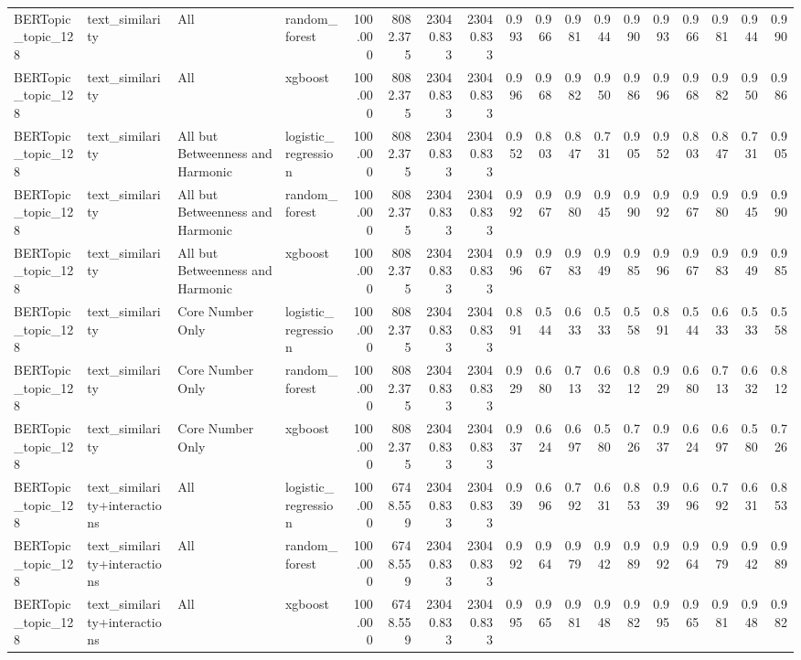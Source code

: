 \begin{tabular}{llllrrrrrrrrrrrrrr}
BERTopic_topic_128 & text_similarity & All & random_forest & 100.000 & 8082.375 & 23040.833 & 23040.833 & 0.993 & 0.966 & 0.981 & 0.944 & 0.990 & 0.993 & 0.966 & 0.981 & 0.944 & 0.990 \\
BERTopic_topic_128 & text_similarity & All & xgboost & 100.000 & 8082.375 & 23040.833 & 23040.833 & 0.996 & 0.968 & 0.982 & 0.950 & 0.986 & 0.996 & 0.968 & 0.982 & 0.950 & 0.986 \\
BERTopic_topic_128 & text_similarity & All but Betweenness and Harmonic & logistic_regression & 100.000 & 8082.375 & 23040.833 & 23040.833 & 0.952 & 0.803 & 0.847 & 0.731 & 0.905 & 0.952 & 0.803 & 0.847 & 0.731 & 0.905 \\
BERTopic_topic_128 & text_similarity & All but Betweenness and Harmonic & random_forest & 100.000 & 8082.375 & 23040.833 & 23040.833 & 0.992 & 0.967 & 0.980 & 0.945 & 0.990 & 0.992 & 0.967 & 0.980 & 0.945 & 0.990 \\
BERTopic_topic_128 & text_similarity & All but Betweenness and Harmonic & xgboost & 100.000 & 8082.375 & 23040.833 & 23040.833 & 0.996 & 0.967 & 0.983 & 0.949 & 0.985 & 0.996 & 0.967 & 0.983 & 0.949 & 0.985 \\
BERTopic_topic_128 & text_similarity & Core Number Only & logistic_regression & 100.000 & 8082.375 & 23040.833 & 23040.833 & 0.891 & 0.544 & 0.633 & 0.533 & 0.558 & 0.891 & 0.544 & 0.633 & 0.533 & 0.558 \\
BERTopic_topic_128 & text_similarity & Core Number Only & random_forest & 100.000 & 8082.375 & 23040.833 & 23040.833 & 0.929 & 0.680 & 0.713 & 0.632 & 0.812 & 0.929 & 0.680 & 0.713 & 0.632 & 0.812 \\
BERTopic_topic_128 & text_similarity & Core Number Only & xgboost & 100.000 & 8082.375 & 23040.833 & 23040.833 & 0.937 & 0.624 & 0.697 & 0.580 & 0.726 & 0.937 & 0.624 & 0.697 & 0.580 & 0.726 \\
BERTopic_topic_128 & text_similarity+interactions & All & logistic_regression & 100.000 & 6748.559 & 23040.833 & 23040.833 & 0.939 & 0.696 & 0.792 & 0.631 & 0.853 & 0.939 & 0.696 & 0.792 & 0.631 & 0.853 \\
BERTopic_topic_128 & text_similarity+interactions & All & random_forest & 100.000 & 6748.559 & 23040.833 & 23040.833 & 0.992 & 0.964 & 0.979 & 0.942 & 0.989 & 0.992 & 0.964 & 0.979 & 0.942 & 0.989 \\
BERTopic_topic_128 & text_similarity+interactions & All & xgboost & 100.000 & 6748.559 & 23040.833 & 23040.833 & 0.995 & 0.965 & 0.981 & 0.948 & 0.982 & 0.995 & 0.965 & 0.981 & 0.948 & 0.982 \\

\end{tabular}
